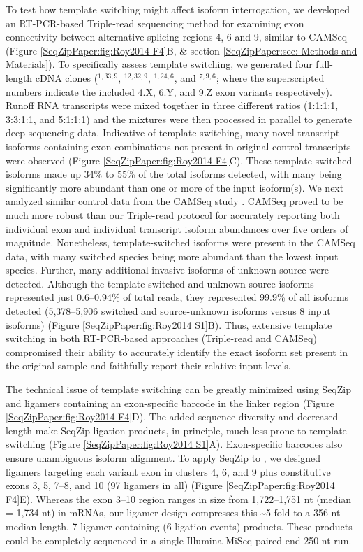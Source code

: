 		To test how template switching might affect \dscam{} isoform interrogation, we developed an RT-PCR-based Triple-read sequencing method for examining exon connectivity between alternative splicing regions 4, 6 and 9, similar to CAMSeq (Figure \ref{SeqZipPaper:fig:Roy2014 F4}B, \& section \ref{SeqZipPaper:sec: Methods and Materials}). To specifically assess template switching, we generated four full-length cDNA clones (\dscam{}$^{1,33,9}$, \dscam{}$^{12,32,9}$, \dscam{}$^{1,24,6}$, and \dscam$^{7,9,6}$; where the superscripted numbers indicate the included 4.X, 6.Y, and 9.Z exon variants respectively). Runoff RNA transcripts were mixed together in three different ratios (1:1:1:1, 3:3:1:1, and 5:1:1:1) and the mixtures were then processed in parallel to generate deep sequencing data. Indicative of template switching, many novel transcript isoforms containing exon combinations not present in original control transcripts were observed (Figure \ref{SeqZipPaper:fig:Roy2014 F4}C). These template-switched isoforms made up 34\% to 55\% of the total isoforms detected, with many being significantly more abundant than one or more of the input isoform(s). We next analyzed similar control data from the CAMSeq study \citep{Sun2013}. CAMSeq proved to be much more robust than our Triple-read protocol for accurately reporting both individual exon and individual transcript isoform abundances over five orders of magnitude. Nonetheless, template-switched isoforms were present in the CAMSeq data, with many switched species being more abundant than the lowest input species. Further, many additional invasive isoforms of unknown source were detected. Although the template-switched and unknown source isoforms represented just 0.6--0.94\% of total reads, they represented 99.9\% of all isoforms detected (5,378--5,906 switched and source-unknown isoforms versus 8 input isoforms) (Figure \ref{SeqZipPaper:fig:Roy2014 S1}B). Thus, extensive template switching in both RT-PCR-based approaches (Triple-read and CAMSeq) compromised their ability to accurately identify the exact isoform set present in the original sample and faithfully report their relative input levels.

		The technical issue of template switching can be greatly minimized using SeqZip and ligamers containing an exon-specific barcode in the linker region (Figure \ref{SeqZipPaper:fig:Roy2014 F4}D). The added sequence diversity and decreased length make SeqZip ligation products, in principle, much less prone to template switching (Figure \ref{SeqZipPaper:fig:Roy2014 S1}A). Exon-specific barcodes also ensure unambiguous isoform alignment. To apply SeqZip to \dscam{}, we designed ligamers targeting each variant exon in clusters 4, 6, and 9 plus constitutive exons 3, 5, 7--8, and 10 (97 ligamers in all) (Figure \ref{SeqZipPaper:fig:Roy2014 F4}E). Whereas the exon 3--10 region ranges in size from 1,722--1,751 nt (median = 1,734 nt) in \dscam{} mRNAs, our ligamer design compresses this \textasciitilde 5-fold to a 356 nt median-length, 7 ligamer-containing (6 ligation events) products. These products could be completely sequenced in a single Illumina MiSeq paired-end 250 nt run.

